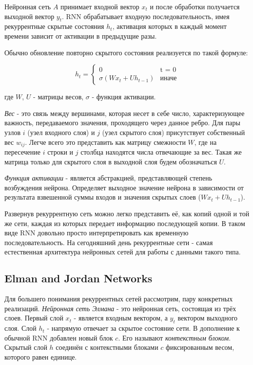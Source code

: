 	Нейронная сеть $A$ принимает входной вектор $x_t$ и после обработки получается выходной вектор $y_t$. RNN обрабатывает входную последовательность, имея рекуррентные скрытые состояния $h_t$, активация которых в каждый момент времени зависит от активации в предыдущие разы.
	
	Обычно обновление повторно скрытого состояния реализуется по такой формуле\cite{3}:
	
	\begin{equation}
        h_t = 
        \begin{cases}
            0 & \text{t = 0}\\
            \sigma(W x_t + U h_{t - 1}) & \text{иначе}
        \end{cases}
    \end{equation}
    
    где $W$, $U$ - матрицы весов, $\sigma$ - функция активации.
    
    \textit{Вес} - это связь между вершинами, которая несет в себе число, характеризующее важность, передаваемого значения, проходящего через данное ребро. Для пары узлов $i$ (узел входного слоя) и $j$ (узел скрытого слоя) присутствует собственный вес $w_{ij}$. Легче всего это представить как матрицу смежности $W$, где на пересечение $i$ строки и $j$ столбца находятся числа отвечающие за вес. Такая же матрица только для скрытого слоя в выходной слоя будем обозначаться $U$. 
    
    \textit{Функция активации} - является абстракцией, представляющей степень возбуждения нейрона. Определяет выходное значение нейрона в зависимости от результата взвешенной суммы входов и значения скрытых слоев ($W x_t + U h_{t - 1}$). \cite{20}
	
	Развернув рекуррентную сеть можно легко представить её, как копий одной и той же сети, каждая из которых передает информацию последующей копии. В таком виде RNN довольно просто интерпретировать как временную последовательность. На сегодняшний день рекуррентные сети - самая естественная архитектура нейронных сетей для работы с данными такого типа. 
	
	\subsection{Elman and Jordan Networks}
	
	Для большего понимания рекуррентных сетей рассмотрим, пару конкретных реализаций. \textit{Нейронная сеть Элмана} - это нейронная сеть, состоящая из трёх слоев. Первый слой $x_t$ - является входным вектором, а $y_t$ вектором выходного слоя. Слой $h_t$ - напрямую отвечает за скрытое состояние сети. В дополнение к обычной RNN добавлен новый блок $c$. Его называют \textit{контекстным блоком}. Скрытый слой $h$ соединён с контекстными блоками $c$ фиксированным весом, которого равен единице.
	
